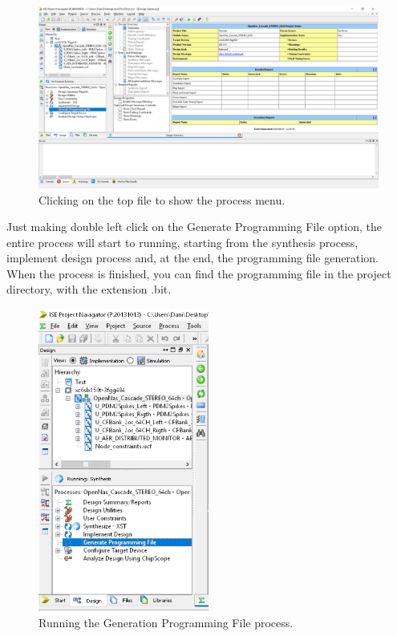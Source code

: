 \begin{figure}[H]
\centering
\includegraphics[width=1\textwidth]{images/Img40_GeneratingProgFile.PNG}
\caption{\label{fig:ISE_project_process}Clicking on the top file to show the process menu.}
\end{figure}

Just making double left click on the Generate Programming File option, the entire process will start to running, starting from the synthesis process, implement design process and, at the end, the programming file generation. When the process is finished, you can find the programming file in the project directory, with the extension .bit.

\begin{figure}[H]
\centering
\includegraphics[width=0.5\textwidth]{images/Img41_Running.PNG}
\caption{\label{fig:running_generating_prog_file}Running the Generation Programming File process.}
\end{figure}

